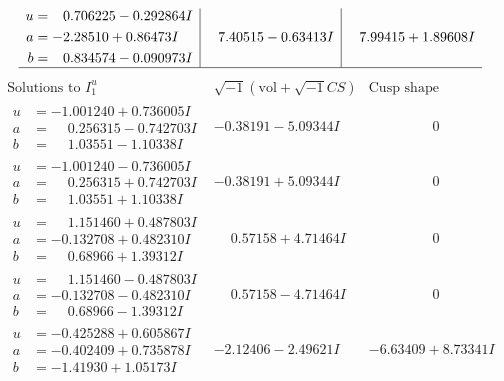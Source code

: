 \documentclass[1p]{elsarticle_modified}
\theoremstyle{definition}
\newcommand{\I}{\sqrt{-1}}
\begin{document}
$$\begin{array}{c|c|c}
\begin{aligned}
u &= \phantom{-}0.706225 - 0.292864 I \\
a &= -2.28510 + 0.86473 I \\
b &= \phantom{-}0.834574 - 0.090973 I\end{aligned}
 & \phantom{-}7.40515 - 0.63413 I & \phantom{-}7.99415 + 1.89608 I\\
 \hline 
 \end{array}$$\newpage$$\begin{array}{c|c|c}  
\text{Solutions to }I^u_{1}& \I (\text{vol} + \sqrt{-1}CS) & \text{Cusp shape}\\
 \hline 
\begin{aligned}
u &= -1.001240 + 0.736005 I \\
a &= \phantom{-}0.256315 - 0.742703 I \\
b &= \phantom{-}1.03551 - 1.10338 I\end{aligned}
 & -0.38191 - 5.09344 I & \phantom{-0.000000 } 0 \\ \hline\begin{aligned}
u &= -1.001240 - 0.736005 I \\
a &= \phantom{-}0.256315 + 0.742703 I \\
b &= \phantom{-}1.03551 + 1.10338 I\end{aligned}
 & -0.38191 + 5.09344 I & \phantom{-0.000000 } 0 \\ \hline\begin{aligned}
u &= \phantom{-}1.151460 + 0.487803 I \\
a &= -0.132708 + 0.482310 I \\
b &= \phantom{-}0.68966 + 1.39312 I\end{aligned}
 & \phantom{-}0.57158 + 4.71464 I & \phantom{-0.000000 } 0 \\ \hline\begin{aligned}
u &= \phantom{-}1.151460 - 0.487803 I \\
a &= -0.132708 - 0.482310 I \\
b &= \phantom{-}0.68966 - 1.39312 I\end{aligned}
 & \phantom{-}0.57158 - 4.71464 I & \phantom{-0.000000 } 0 \\ \hline\begin{aligned}
u &= -0.425288 + 0.605867 I \\
a &= -0.402409 + 0.735878 I \\
b &= -1.41930 + 1.05173 I\end{aligned}
 & -2.12406 - 2.49621 I & -6.63409 + 8.73341 I \\ \hline\begin{aligned}

\end{aligned}
\end{array}$$
\end{document}

